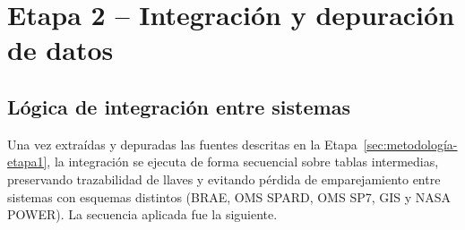 \section{Etapa 2 – Integración y depuración de datos}
\label{sec:metodología-etapa2}

\subsection{Lógica de integración entre sistemas}
\label{sec:logica_integracion}
    Una vez extraídas y depuradas las fuentes descritas en la Etapa~\ref{sec:metodología-etapa1}, la integración se ejecuta de forma secuencial sobre tablas intermedias, preservando trazabilidad de llaves y evitando pérdida de emparejamiento entre sistemas con esquemas distintos (BRAE, OMS SPARD, OMS SP7, GIS y NASA POWER). La secuencia aplicada fue la siguiente.

